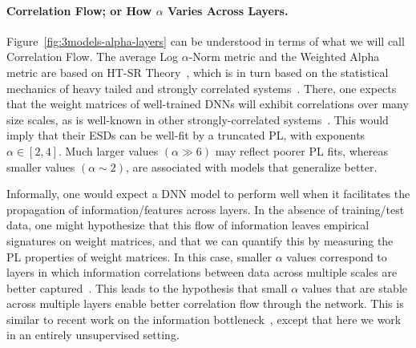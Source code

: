 \paragraph{Correlation Flow; or How $\alpha$ Varies Across Layers.}

Figure~\ref{fig:3models-alpha-layers} can be understood in terms of what we will call Correlation Flow.
The average Log $\alpha$-Norm metric and the Weighted Alpha metric are based on HT-SR Theory~\cite{MM18_TR, MM19_HTSR_ICML, MM20_SDM}, which is in turn based on the statistical mechanics of heavy tailed and strongly correlated systems~\cite{BouchaudPotters03, SornetteBook, BP11, bun2017}. 
There, one expects that the weight matrices of well-trained DNNs will exhibit correlations over many size scales, as is well-known in other strongly-correlated systems~\cite{BouchaudPotters03, SornetteBook}. 
This would imply that their ESDs can be well-fit by a truncated PL, with exponents $\alpha\in[2,4]$.
Much larger values $(\alpha\gg 6)$ may reflect poorer PL fits, whereas smaller values $(\alpha\sim 2)$, are associated with models that generalize better.

Informally, one would expect a DNN model to perform well when it facilitates the propagation of information/features across layers.
In the absence of training/test data, one might hypothesize that this flow of information leaves empirical signatures on weight matrices, and that we can quantify this by measuring the PL properties of weight matrices.
In this case, smaller $\alpha$ values correspond to layers in which information correlations between data across multiple scales are better captured~\cite{MM18_TR,SornetteBook}.
This leads to the hypothesis that small $\alpha$ values that are stable across multiple layers enable better correlation flow through the network.
This is similar to recent work on the information bottleneck~\cite{ST17_TR}, except that here we work in an entirely unsupervised setting.

